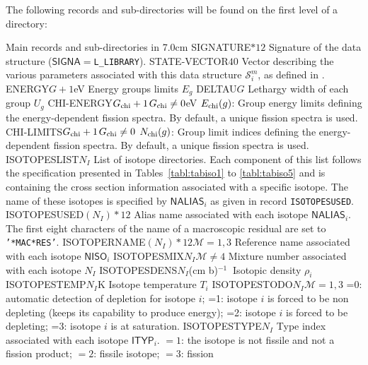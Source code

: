 The following records and sub-directories will be found on the first level of a 
directory:
\begin{DescriptionEnregistrement}{Main records and sub-directories in }{7.0cm}
\CharEnr
  {SIGNATURE}{$*12$}
  {Signature of the  data structure ($\mathsf{SIGNA}=${\tt L\_LIBRARY}).}
\IntEnr
  {STATE-VECTOR}{$40$}
  {Vector describing the various parameters associated with this data structure $\mathcal{S}^{m}_{i}$,
  as defined in .}
\RealEnr
  {ENERGY}{$G+1$}{eV}
  {Energy groups limits $E_{g}$}
\RealEnr
  {DELTAU}{$G$}{}
  {Lethargy width of each group $U_{g}$}
\OptRealEnr
  {CHI-ENERGY}{$G_{\rm chi}+1$}{$G_{\rm chi}\ne 0$}{eV}
  {$E_{\rm chi}(g)$: Group energy limits defining the energy-dependent fission spectra. By default, a unique fission spectra is used.}
\OptIntEnr
  {CHI-LIMITS}{$G_{\rm chi}+1$}{$G_{\rm chi}\ne 0$}
  {$N_{\rm chi}(g)$: Group limit indices defining the energy-dependent fission spectra. By default, a unique fission spectra is used.}
\DirlEnr
  {ISOTOPESLIST}{$N_{I}$}
  {List of {\sc isotope} directories. Each component of this list follows the  specification
  presented in Tables~\ref{tabl:tabiso1} to \ref{tabl:tabiso5} and is containing the cross section
  information associated with a specific isotope. The name of these isotopes is specified by 
  $\mathsf{NALIAS}_{i}$ as given in record {\tt ISOTOPESUSED}.}
\CharEnr
  {ISOTOPESUSED}{$(N_{I})*12$}
  {Alias name associated with each isotope $\mathsf{NALIAS}_{i}$. The first eight characters of the name of a macroscopic residual are set to {\tt '*MAC*RES'}.}
\OptCharEnr
  {ISOTOPERNAME}{$(N_{I})*12$}{$\mathcal{M}=1,3$}
  {Reference name associated with each isotope $\mathsf{NISO}_{i}$}
\OptIntEnr
  {ISOTOPESMIX}{$N_{I}$}{$\mathcal{M}\ne 4$}
  {Mixture number associated with each isotope $N_{I}$}
\RealEnr
  {ISOTOPESDENS}{$N_{I}$}{(cm b)$^{-1}\ $}
  {Isotopic density $\rho_{i}$}
\RealEnr
  {ISOTOPESTEMP}{$N_{I}$}{K}
  {Isotope temperature $T_{i}$}
\OptIntEnr
  {ISOTOPESTODO}{$N_{I}$}{$\mathcal{M}=1,3$}
  {=0: automatic detection of depletion for isotope $i$; =1: isotope $i$ is
  forced to be non depleting (keeps its capability to produce energy); =2: isotope $i$ is
  forced to be depleting; =3: isotope $i$ is at saturation.}
\IntEnr
  {ISOTOPESTYPE}{$N_{I}$}
  {Type index associated with each isotope $\mathsf{ITYP}_{i}$. $=1$: the isotope is
  not fissile and not a fission product; $=2$: fissile isotope; $=3$: fission
}
\end{DescriptionEnregistrement}
